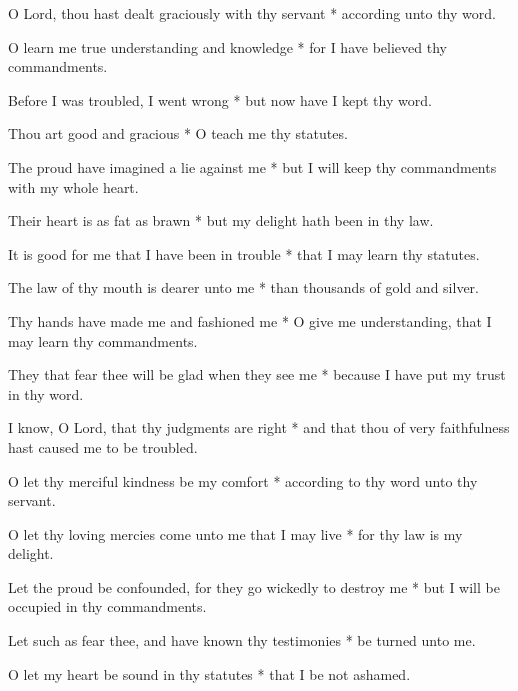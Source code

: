 O Lord, thou hast dealt graciously with thy servant * according unto thy word.

O learn me true understanding and knowledge * for I have believed thy commandments.

Before I was troubled, I went wrong * but now have I kept thy word.

Thou art good and gracious * O teach me thy statutes.

The proud have imagined a lie against me * but I will keep thy commandments with my whole heart.

Their heart is as fat as brawn * but my delight hath been in thy law.

It is good for me that I have been in trouble * that I may learn thy statutes.

The law of thy mouth is dearer unto me * than thousands of gold and silver.

Thy hands have made me and fashioned me * O give me understanding, that I may learn thy commandments.

They that fear thee will be glad when they see me * because I have put my trust in thy word.

I know, O Lord, that thy judgments are right * and that thou of very faithfulness hast caused me to be troubled.

O let thy merciful kindness be my comfort * according to thy word unto thy servant.

O let thy loving mercies come unto me that I may live * for thy law is my delight.

Let the proud be confounded, for they go wickedly to destroy me * but I will be occupied in thy commandments.

Let such as fear thee, and have known thy testimonies * be turned unto me.

O let my heart be sound in thy statutes * that I be not ashamed.